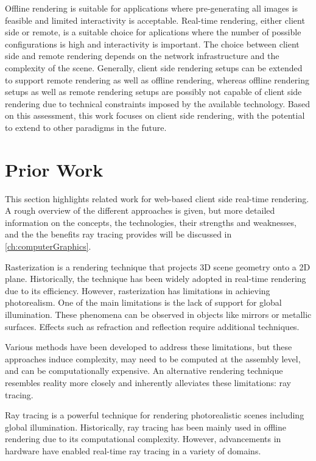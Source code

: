 Offline rendering is suitable for applications where pre-generating all images is feasible and limited interactivity is acceptable. Real-time rendering, either client side or remote, is a suitable choice for aplications where the number of possible configurations is high and interactivity is important. The choice between client side and remote rendering depends on the network infrastructure and the complexity of the scene.
Generally, client side rendering setups can be extended to support remote rendering as well as offline rendering, whereas offline rendering setups as well as remote rendering setups are possibly not capable of client side rendering due to technical constraints imposed by the available technology. Based on this assessment, this work focuses on client side rendering, with the potential to extend to other paradigms in the future.

\section{Prior Work}

This section highlights related work for web-based client side real-time rendering. A rough overview of the different approaches is given, but more detailed information on the concepts, the technologies, their strengths and weaknesses, and the the benefits ray tracing provides will be discussed in \autoref{ch:computerGraphics}.

Rasterization is a rendering technique that projects 3D scene geometry onto a 2D plane. Historically, the technique has been widely adopted in real-time rendering due to its efficiency. However, rasterization has limitations in achieving photorealism. One of the main limitations is the lack of support for global illumination. These phenomena can be observed in objects like mirrors or metallic surfaces. Effects such as refraction and reflection require additional techniques.

Various methods have been developed to address these limitations, but these approaches induce complexity, may need to be computed at the assembly level, and can be computationally expensive. An alternative rendering technique resembles reality more closely and inherently alleviates these limitations: ray tracing.

Ray tracing is a powerful technique for rendering photorealistic scenes including global illumination. Historically, ray tracing has been mainly used in offline rendering due to its computational complexity. However, advancements in hardware have enabled real-time ray tracing in a variety of domains.

